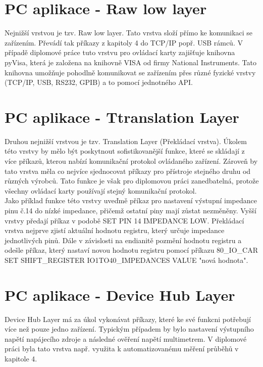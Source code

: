 \section{PC aplikace - Raw low layer}
Nejnižší vrstvou je tzv. Raw low layer. Tato vrstva složí přímo ke komunikaci se zařízením. Převádí tak příkazy z kapitoly 4 do TCP/IP popř. USB rámců.
V případě diplomové práce tuto vrstvu pro ovládací karty zajišťuje knihovna pyVisa, která je založena na knihovně VISA od firmy National Instruments.
Tato knihovna umožňuje pohodlně komunikovat se zařízením přes různé fyzické vrstvy (TCP/IP, USB, RS232, GPIB) a to pomocí jednotného API.\\


\section{PC aplikace - Ttranslation Layer}
Druhou nejnižší vrstvou je tzv. Translation Layer (Překládací vrstva). Úkolem této vrstvy by mělo být poskytnout sofistikovanější funkce, které se skládají z více příkazů,
kterou nabízí komunikační protokol ovládaného zařízení. Zároveň by tato vrstva měla co nejvíce sjednocovat příkazy pro přístroje stejného druhu od různých výrobců.
Tato funkce je však pro diplomovou práci zanedbatelná, protože všechny ovládací karty používají stejný komunikační protokol.\\

Jako příklad funkce této vrstvy uveďmě příkaz pro nastavení výstupní impedance pinu č.14 do nízké impedance, přičemž ostatní piny mají zůstat nezměněny.
Vyšší vrstvy předají příkaz v podobě SET PIN 14 IMPEDANCE LOW. Překládací vrstva nejprve zjistí aktuální hodnotu registru, který určuje impedance jednotlivých pinů.
Dále v závislosti na endianitě pozmění hodnotu registru a odešle příkaz, který nastaví novou hodnotu registru pomocí příkazu
80\_IO\_CAR SET SHIFT\_REGISTER IO1TO40\_IMPEDANCES VALUE "nová hodnota".\\


\section{PC aplikace - Device Hub Layer}
Device Hub Layer má za úkol vykonávat příkazy, které ke své funkcni potřebují více než pouze jedno zařízení.
Typickým případem by bylo nastavení výstupního napětí napájecího zdroje a následné ověření napětí multimetrem.
V diplomové práci byla tato vrstva např. využita k automatizovanému měření průběhů v kapitole 4.\\


